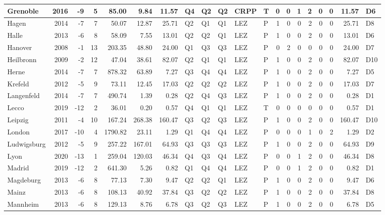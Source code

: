 \begin{tabular}{l|r|r|r|r|r|r|l|l|l|l|l|r|r|r|r|r|r|r|l}
\hline
Grenoble & 2016 & -9 & 5 & 85.00 & 9.84 & 11.57 & Q4 & Q2 & Q2 & CRPP & T & 0 & 0 & 1 & 2 & 0 & 0 & 11.57 & D6\\
\hline
Hagen & 2014 & -7 & 7 & 50.07 & 12.87 & 25.71 & Q2 & Q1 & Q1 & LEZ & P & 1 & 0 & 0 & 2 & 0 & 0 & 25.71 & D8\\
\hline
Halle & 2013 & -6 & 8 & 58.09 & 7.55 & 13.01 & Q2 & Q2 & Q1 & LEZ & P & 1 & 0 & 0 & 2 & 0 & 0 & 13.01 & D6\\
\hline
Hanover & 2008 & -1 & 13 & 203.35 & 48.80 & 24.00 & Q1 & Q3 & Q3 & LEZ & P & 0 & 2 & 0 & 0 & 0 & 0 & 24.00 & D7\\
\hline
Heilbronn & 2009 & -2 & 12 & 47.04 & 38.61 & 82.07 & Q2 & Q1 & Q1 & LEZ & P & 1 & 0 & 0 & 2 & 0 & 0 & 82.07 & D10\\
\hline
Herne & 2014 & -7 & 7 & 878.32 & 63.89 & 7.27 & Q3 & Q4 & Q4 & LEZ & P & 1 & 0 & 0 & 2 & 0 & 0 & 7.27 & D5\\
\hline
Krefeld & 2012 & -5 & 9 & 73.11 & 12.45 & 17.03 & Q2 & Q2 & Q2 & LEZ & P & 1 & 0 & 0 & 2 & 0 & 0 & 17.03 & D7\\
\hline
Langenfeld & 2014 & -7 & 7 & 490.74 & 1.39 & 0.28 & Q2 & Q4 & Q3 & LEZ & P & 1 & 0 & 0 & 2 & 0 & 0 & 0.28 & D1\\
\hline
Lecco & 2019 & -12 & 2 & 36.01 & 0.20 & 0.57 & Q4 & Q1 & Q1 & LEZ & T & 0 & 0 & 0 & 0 & 0 & 0 & 0.57 & D1\\
\hline
Leipzig & 2011 & -4 & 10 & 167.24 & 268.38 & 160.47 & Q3 & Q2 & Q3 & LEZ & P & 1 & 0 & 0 & 2 & 0 & 0 & 160.47 & D10\\
\hline
London & 2017 & -10 & 4 & 1790.82 & 23.11 & 1.29 & Q1 & Q4 & Q4 & LEZ & P & 0 & 0 & 0 & 1 & 0 & 2 & 1.29 & D2\\
\hline
Ludwigsburg & 2012 & -5 & 9 & 257.22 & 167.01 & 64.93 & Q3 & Q3 & Q3 & LEZ & P & 1 & 0 & 0 & 2 & 0 & 0 & 64.93 & D9\\
\hline
Lyon & 2020 & -13 & 1 & 259.04 & 120.03 & 46.34 & Q4 & Q3 & Q4 & LEZ & P & 0 & 0 & 1 & 2 & 0 & 0 & 46.34 & D8\\
\hline
Madrid & 2019 & -12 & 2 & 641.30 & 5.26 & 0.82 & Q1 & Q4 & Q4 & LEZ & P & 0 & 0 & 1 & 2 & 0 & 0 & 0.82 & D1\\
\hline
Magdeburg & 2013 & -6 & 8 & 77.13 & 7.30 & 9.47 & Q2 & Q2 & Q1 & LEZ & P & 1 & 0 & 0 & 2 & 0 & 0 & 9.47 & D6\\
\hline
Mainz & 2013 & -6 & 8 & 108.13 & 40.92 & 37.84 & Q3 & Q2 & Q2 & LEZ & P & 1 & 0 & 0 & 2 & 0 & 0 & 37.84 & D8\\
\hline
Mannheim & 2013 & -6 & 8 & 129.13 & 8.76 & 6.78 & Q3 & Q2 & Q3 & LEZ & P & 1 & 0 & 0 & 2 & 0 & 0 & 6.78 & D5\\

\end{tabular}

